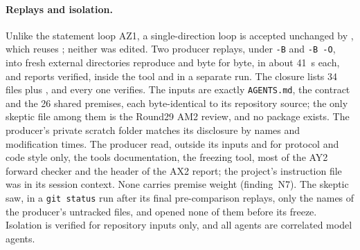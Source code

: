 \paragraph{Replays and isolation.}
Unlike the statement loop AZ1, a single-direction loop is accepted unchanged
by , which reuses ;
neither was edited. Two producer replays, under \texttt{-B} and
\texttt{-B -O}, into fresh external directories reproduce
 and  byte for
byte, in about 41~s each, and  reports verified,
inside the tool and in a separate run. The closure lists 34 files plus
, and every one verifies. The inputs are exactly
\texttt{AGENTS.md}, the contract and the 26 shared premises, each
byte-identical to its repository source; the only skeptic file among them is
the Round29 AM2 review, and no  package exists. The
producer's private scratch folder matches its disclosure by names and
modification times. The producer read, outside its inputs and for protocol
and code style only, the tools documentation, the freezing tool, most of the
AY2 forward checker and the header of the AX2 report; the project's
instruction file was in its session context. None carries premise weight
(finding~N7). The skeptic saw, in a \texttt{git status} run after its final
pre-comparison replays, only the names of the producer's untracked files, and
opened none of them before its freeze. Isolation is verified for repository
inputs only, and all agents are correlated model agents.

